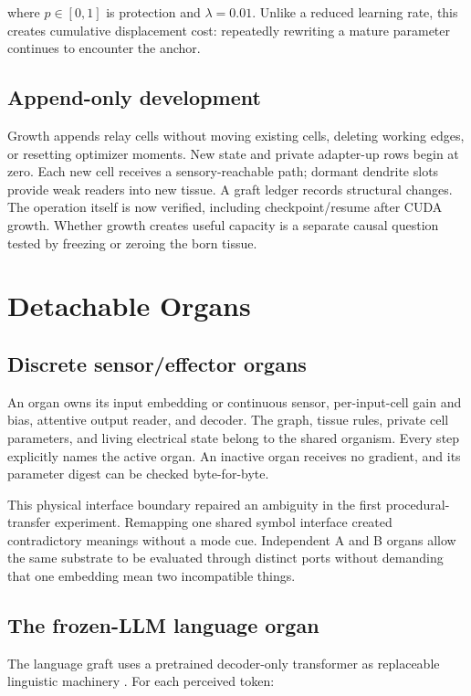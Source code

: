 \documentclass[11pt]{article}
\begin{document}
where $p\in[0,1]$ is protection and $\lambda=0.01$. Unlike a reduced learning rate,
this creates cumulative displacement cost: repeatedly rewriting a mature parameter
continues to encounter the anchor.

\subsection{Append-only development}

Growth appends relay cells without moving existing cells, deleting working edges, or
resetting optimizer moments. New state and private adapter-up rows begin at zero. Each
new cell receives a sensory-reachable path; dormant dendrite slots provide weak readers
into new tissue. A graft ledger records structural changes. The operation itself is now
verified, including checkpoint/resume after CUDA growth. Whether growth creates useful
capacity is a separate causal question tested by freezing or zeroing the born tissue.

\section{Detachable Organs}

\subsection{Discrete sensor/effector organs}

An organ owns its input embedding or continuous sensor, per-input-cell gain and bias,
attentive output reader, and decoder. The graph, tissue rules, private cell parameters,
and living electrical state belong to the shared organism. Every step explicitly names
the active organ. An inactive organ receives no gradient, and its parameter digest can
be checked byte-for-byte.

This physical interface boundary repaired an ambiguity in the first procedural-transfer
experiment. Remapping one shared symbol interface created contradictory meanings without
a mode cue. Independent A and B organs allow the same substrate to be evaluated through
distinct ports without demanding that one embedding mean two incompatible things.

\subsection{The frozen-LLM language organ}

The language graft uses a pretrained decoder-only transformer as replaceable linguistic
machinery \cite{vaswani2017attention,grattafiori2024llama}. For each perceived token:
\end{document}
